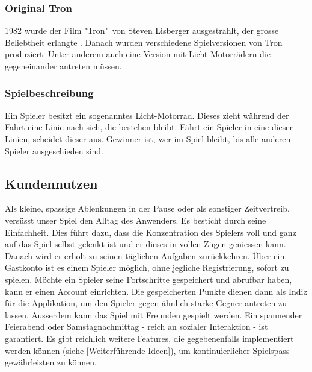 \documentclass[11pt,ngerman]{article}
\begin{document}
    \subsubsection{Original Tron}
    1982 wurde der Film "Tron"\ von Steven Lisberger ausgestrahlt, der grosse Beliebtheit erlangte \cite{lisbergerTRON1982}\cite{TronFilm2020}. Danach wurden verschiedene Spielversionen von Tron produziert. Unter anderem auch eine Version mit Licht-Motorrädern die gegeneinander antreten müssen.

    \subsubsection{Spielbeschreibung}
    Ein Spieler besitzt ein sogenanntes Licht-Motorrad. Dieses zieht während der Fahrt eine Linie nach sich, die bestehen bleibt. Fährt ein Spieler in eine dieser Linien, scheidet dieser aus. Gewinner ist, wer im Spiel bleibt, bis alle anderen Spieler ausgeschieden sind.

    \subsection{Kundennutzen}
    Als kleine, spassige Ablenkungen in der Pause oder als sonstiger Zeitvertreib, versüsst unser Spiel den Alltag des Anwenders. Es besticht durch seine Einfachheit. Dies führt dazu, dass die Konzentration des Spielers voll und ganz auf das Spiel selbst gelenkt ist und er dieses in vollen Zügen geniessen kann. Danach wird er erholt zu seinen täglichen Aufgaben zurückkehren. Über ein Gastkonto ist es einem Spieler möglich, ohne jegliche Registrierung, sofort zu spielen. Möchte ein Spieler seine Fortschritte gespeichert und abrufbar haben, kann er einen Account einrichten. Die gespeicherten Punkte dienen dann als Indiz für die Applikation, um den Spieler gegen ähnlich starke Gegner antreten zu lassen. Ausserdem kann das Spiel mit Freunden gespielt werden. Ein spannender Feierabend oder Samstagnachmittag - reich an sozialer Interaktion - ist garantiert.
    Es gibt reichlich weitere Features, die gegebenenfalls implementiert werden können (siehe \ref{Weiterführende Ideen}), um kontinuierlicher Spielspass gewährleisten zu können.
\end{document}
